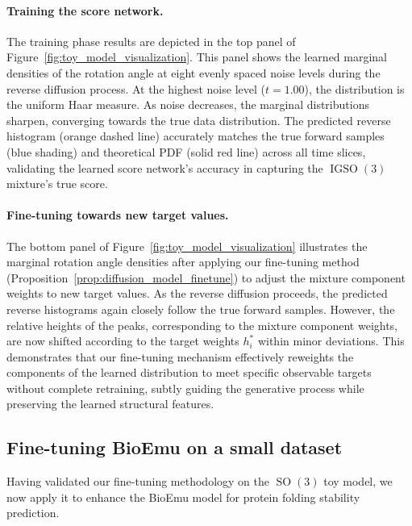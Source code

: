 \documentclass{article}
\theoremstyle{plain}
\theoremstyle{definition}
\theoremstyle{remark}
\DeclareMathOperator{\SO}{SO}
\DeclareMathOperator{\IGSO}{IGSO}
\begin{document}
\paragraph{Training the score network.}
The training phase results are depicted in the top panel of Figure~\ref{fig:toy_model_visualization}. This panel shows the learned marginal densities of the rotation angle at eight evenly spaced noise levels during the reverse diffusion process. At the highest noise level ($t=1.00$), the distribution is the uniform Haar measure. As noise decreases, the marginal distributions sharpen, converging towards the true data distribution. The predicted reverse histogram (orange dashed line) accurately matches the true forward samples (blue shading) and theoretical PDF (solid red line) across all time slices, validating the learned score network's accuracy in capturing the $\IGSO(3)$ mixture's true score.

\paragraph{Fine-tuning towards new target values.}
The bottom panel of Figure~\ref{fig:toy_model_visualization} illustrates the marginal rotation angle densities after applying our fine-tuning method (Proposition~\ref{prop:diffusion_model_finetune}) to adjust the mixture component weights to new target values. As the reverse diffusion proceeds, the predicted reverse histograms again closely follow the true forward samples. However, the relative heights of the peaks, corresponding to the mixture component weights, are now shifted according to the target weights $h_i^*$ within minor deviations. This demonstrates that our fine-tuning mechanism effectively reweights the components of the learned distribution to meet specific observable targets without complete retraining, subtly guiding the generative process while preserving the learned structural features.

\subsection{Fine-tuning BioEmu on a small dataset}

Having validated our fine-tuning methodology on the $\SO(3)$ toy model, we now apply it to enhance the BioEmu model for protein folding stability prediction.
\end{document}
